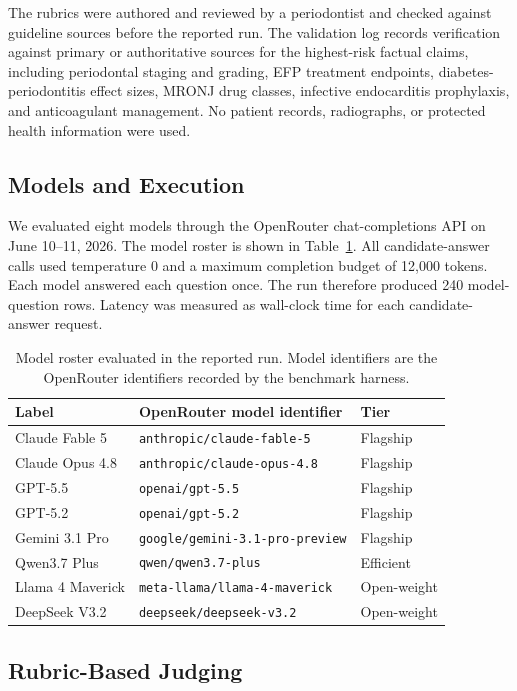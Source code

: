 \documentclass[11pt]{article}
\begin{document}
The rubrics were authored and reviewed by a periodontist and checked against guideline sources before the reported run.
The validation log records verification against primary or authoritative sources for the highest-risk factual claims, including periodontal staging and grading, EFP treatment endpoints, diabetes-periodontitis effect sizes, MRONJ drug classes, infective endocarditis prophylaxis, and anticoagulant management.
No patient records, radiographs, or protected health information were used.

\subsection{Models and Execution}

We evaluated eight models through the OpenRouter chat-completions API on June 10--11, 2026.
The model roster is shown in Table~\ref{tab:models}.
All candidate-answer calls used temperature 0 and a maximum completion budget of 12,000 tokens.
Each model answered each question once.
The run therefore produced 240 model-question rows.
Latency was measured as wall-clock time for each candidate-answer request.

\begin{table}[t]
\centering
\caption{Model roster evaluated in the reported run. Model identifiers are the OpenRouter identifiers recorded by the benchmark harness.}
\label{tab:models}
\begin{tabular}{lll}
\toprule
Label & OpenRouter model identifier & Tier \\
\midrule
Claude Fable 5 & \texttt{anthropic/claude-fable-5} & Flagship \\
Claude Opus 4.8 & \texttt{anthropic/claude-opus-4.8} & Flagship \\
GPT-5.5 & \texttt{openai/gpt-5.5} & Flagship \\
GPT-5.2 & \texttt{openai/gpt-5.2} & Flagship \\
Gemini 3.1 Pro & \texttt{google/gemini-3.1-pro-preview} & Flagship \\
Qwen3.7 Plus & \texttt{qwen/qwen3.7-plus} & Efficient \\
Llama 4 Maverick & \texttt{meta-llama/llama-4-maverick} & Open-weight \\
DeepSeek V3.2 & \texttt{deepseek/deepseek-v3.2} & Open-weight \\
\bottomrule
\end{tabular}
\end{table}

\subsection{Rubric-Based Judging}
\end{document}
